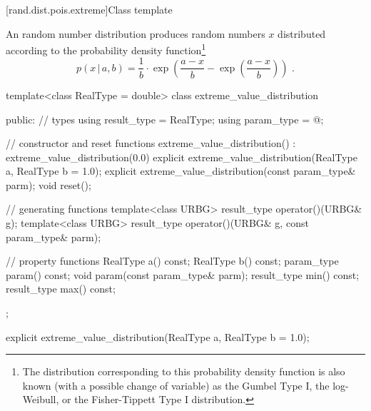 
[rand.dist.pois.extreme]{Class template }
%
%

\pnum
An  random number distribution
produces random numbers $x$
distributed according to
the probability density function\footnote{The distribution corresponding to
 this probability density function
 is also known
 (with a possible change of variable)
 as the Gumbel Type I,
 the log-Weibull,
 or the Fisher-Tippett Type I
 distribution.}%
%
\[ p(x\,|\,a,b) = \frac{1}{b}
     \cdot \exp\left(\frac{a-x}{b} - \exp\left(\frac{a-x}{b}\right)\right)
     \text{ .} \]

%
%
\begin{codeblock}
template<class RealType = double>
  class extreme_value_distribution {
  public:
    // types
    using result_type = RealType;
    using param_type  = @\unspec@;

    // constructor and reset functions
    extreme_value_distribution() : extreme_value_distribution(0.0) {}
    explicit extreme_value_distribution(RealType a, RealType b = 1.0);
    explicit extreme_value_distribution(const param_type& parm);
    void reset();

    // generating functions
    template<class URBG>
      result_type operator()(URBG& g);
    template<class URBG>
      result_type operator()(URBG& g, const param_type& parm);

    // property functions
    RealType a() const;
    RealType b() const;
    param_type param() const;
    void param(const param_type& parm);
    result_type min() const;
    result_type max() const;
  };
\end{codeblock}


%
\begin{itemdecl}
explicit extreme_value_distribution(RealType a, RealType b = 1.0);
\end{itemdecl}

